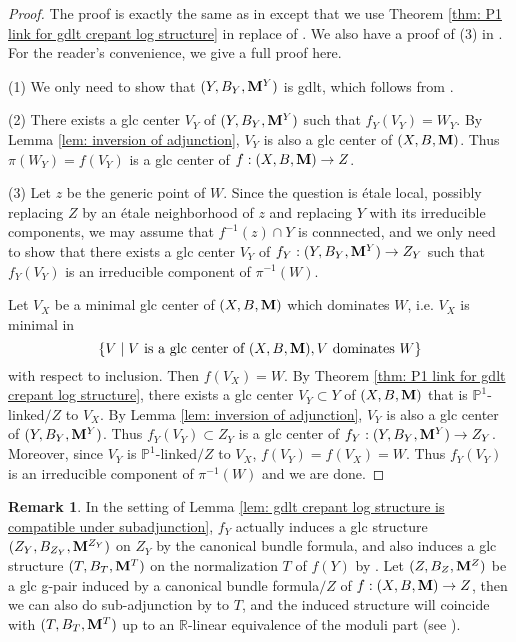 \documentclass[11pt]{amsart}
\numberwithin{equation}{section}
\newcommand{\Mm}{{\bf{M}}}
\theoremstyle{definition}
\theoremstyle{definition}
\newtheorem{rem}[thm]{Remark}
\theoremstyle{definition}
\begin{document}
\begin{proof}
  The proof is exactly the same as in \cite[Corollary 4.42]{Kol13}
  except that we use Theorem \ref{thm: P1 link for gdlt crepant log
  structure} in replace of \cite[Theorem 4.40]{Kol13}. We also have a
  proof of (3) in \cite[Proof of 4.1]{JLX22}. For the reader's
  convenience, we give a full proof here.

  (1) We only need to show that $(Y,B_Y,\Mm^Y)$ is gdlt, which
  follows from \cite[Lemma 2.6]{HL22}.

  (2) There exists a glc center $V_Y$ of $(Y,B_Y,\Mm^Y)$ such that
  $f_Y(V_Y)=W_Y$. By Lemma \ref{lem: inversion of adjunction}, $V_Y$
  is also a glc center of $(X,B,\Mm)$. Thus $\pi(W_Y)=f(V_Y)$ is a
  glc center of $f: (X,B,\Mm)\rightarrow Z$.

  (3) Let $z$ be the generic point of $W$. Since the question is
  \'etale local, possibly replacing $Z$ by an \'etale neighborhood of
  $z$ and replacing $Y$ with its irreducible components, we may
  assume that $f^{-1}(z)\cap Y$ is connnected, and we only need to
  show that there exists a glc center $V_Y$ of $f_Y:
  (Y,B_Y,\Mm^Y)\rightarrow Z_Y$ such that $f_Y(V_Y)$ is an
  irreducible component of $\pi^{-1}(W)$.

  Let $V_X$ be a minimal glc center of $(X,B,\Mm)$ which dominates
  $W$, i.e. $V_X$ is minimal in
  $$\{V\mid V\text{ is a glc center of }(X,B,\Mm), V\text{ dominates }W\}$$
  with respect to inclusion. Then $f(V_X)=W$. By Theorem \ref{thm: P1
  link for gdlt crepant log structure}, there exists a glc center
  $V_Y\subset Y$ of $(X,B,\Mm)$ that is $\mathbb P^1$-linked$/Z$ to
  $V_X$. By Lemma \ref{lem: inversion of adjunction}, $V_Y$ is also a
  glc center of $(Y,B_Y,\Mm^Y)$. Thus $f_Y(V_Y)\subset Z_Y$ is a glc
  center of $f_Y: (Y,B_Y,\Mm^Y)\rightarrow Z_Y$. Moreover, since
  $V_Y$ is $\mathbb P^1$-linked$/Z$ to $V_X$, $f(V_Y)=f(V_X)=W$. Thus
  $f_Y(V_Y)$ is an irreducible component of $\pi^{-1}(W)$ and we are done.
\end{proof}

\begin{rem}
  In the setting of Lemma \ref{lem: gdlt crepant log structure is
  compatible under subadjunction}, $f_Y$ actually induces a glc
  structure $(Z_Y,B_{Z_Y},\Mm^{Z_Y})$ on $Z_Y$ by the canonical
  bundle formula, and also induces a glc structure
  $(T,B_{T},\Mm^{T})$ on the normalization $T$ of $f(Y)$ by
  \cite[Theorem 1.2]{HL21b}. Let $(Z,B_Z,\Mm^Z)$ be a glc g-pair
  induced by a canonical bundle formula$/Z$ of $f:
  (X,B,\Mm)\rightarrow Z$, then we can also do sub-adjunction by
  \cite[Theorem 5.1]{HL21b} to $T$, and the induced structure will
  coincide with $(T, B_{T},\Mm^{T})$ up to an $\mathbb R$-linear
  equivalence of the moduli part (see \cite[Section 4]{JLX22}).
\end{rem}
\end{document}
